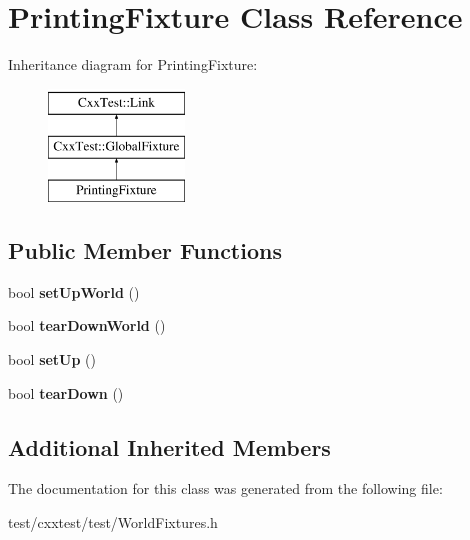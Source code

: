 \hypertarget{classPrintingFixture}{\section{Printing\-Fixture Class Reference}
\label{classPrintingFixture}
}
Inheritance diagram for Printing\-Fixture\-:\begin{figure}[H]
\begin{center}
\leavevmode
\includegraphics[height=3.000000cm]{classPrintingFixture}
\end{center}
\end{figure}
\subsection*{Public Member Functions}
\begin{DoxyCompactItemize}
\item 
\hypertarget{classPrintingFixture_a78ebb04ba9c8da5434c8352d0e5e9f90}{bool {\bfseries set\-Up\-World} ()}\label{classPrintingFixture_a78ebb04ba9c8da5434c8352d0e5e9f90}

\item 
\hypertarget{classPrintingFixture_a5b1f38ee7bc1ed004fe36e427961f7a7}{bool {\bfseries tear\-Down\-World} ()}\label{classPrintingFixture_a5b1f38ee7bc1ed004fe36e427961f7a7}

\item 
\hypertarget{classPrintingFixture_a18c8743c3e3e9a160f4975f27189bac7}{bool {\bfseries set\-Up} ()}\label{classPrintingFixture_a18c8743c3e3e9a160f4975f27189bac7}

\item 
\hypertarget{classPrintingFixture_ac90052ba611d3e3c96dd1be03bf402bd}{bool {\bfseries tear\-Down} ()}\label{classPrintingFixture_ac90052ba611d3e3c96dd1be03bf402bd}

\end{DoxyCompactItemize}
\subsection*{Additional Inherited Members}


The documentation for this class was generated from the following file\-:\begin{DoxyCompactItemize}
\item 
test/cxxtest/test/World\-Fixtures.\-h\end{DoxyCompactItemize}
